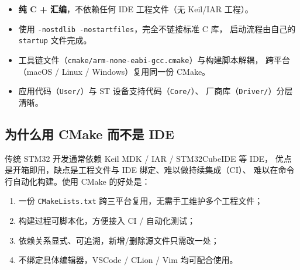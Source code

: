 \begin{itemize}
  \item \textbf{纯 C + 汇编}，不依赖任何 IDE 工程文件（无 Keil/IAR 工程）。
  \item 使用 \lstinline|-nostdlib -nostartfiles|，完全不链接标准 C 库，
        启动流程由自己的 \texttt{startup} 文件完成。
  \item 工具链文件（\texttt{cmake/arm-none-eabi-gcc.cmake}）与构建脚本解耦，
        跨平台（macOS / Linux / Windows）复用同一份 CMake。
  \item 应用代码（\texttt{User/}）与 ST 设备支持代码（\texttt{Core/}）、
        厂商库（\texttt{Driver/}）分层清晰。
\end{itemize}

\subsection{为什么用 CMake 而不是 IDE}

传统 STM32 开发通常依赖 Keil MDK / IAR / STM32CubeIDE 等 IDE，
优点是开箱即用，缺点是工程文件与 IDE 绑定、难以做持续集成（CI）、
难以在命令行自动化构建。使用 CMake 的好处是：

\begin{enumerate}
  \item 一份 \texttt{CMakeLists.txt} 跨三平台复用，无需手工维护多个工程文件；
  \item 构建过程可脚本化，方便接入 CI / 自动化测试；
  \item 依赖关系显式、可追溯，新增/删除源文件只需改一处；
  \item 不绑定具体编辑器，VSCode / CLion / Vim 均可配合使用。
\end{enumerate}
